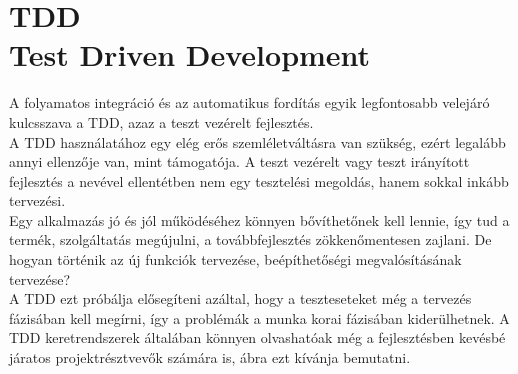 \section{TDD\\\small{Test Driven Development}}
A folyamatos integráció és az automatikus fordítás egyik legfontosabb velejáró kulcsszava a TDD, azaz a teszt vezérelt fejlesztés.
\\
A TDD használatához egy elég erős szemléletváltásra van szükség, ezért legalább annyi ellenzője van, mint támogatója. A teszt vezérelt vagy teszt irányított fejlesztés a nevével ellentétben nem egy tesztelési megoldás, hanem sokkal inkább tervezési. \cite{tddjs_definition}
\\
Egy alkalmazás jó és jól működéséhez könnyen bővíthetőnek kell lennie, így tud a termék, szolgáltatás megújulni, a továbbfejlesztés zökkenőmentesen zajlani. De hogyan történik az új funkciók tervezése, beépíthetőségi megvalósításának tervezése?
\\
A TDD ezt próbálja elősegíteni azáltal, hogy a teszteseteket még a tervezés fázisában kell megírni, így a problémák a munka korai fázisában kiderülhetnek. A TDD keretrendszerek általában könnyen olvashatóak még a fejlesztésben kevésbé járatos projektrésztvevők számára is,  ábra ezt kívánja bemutatni.

